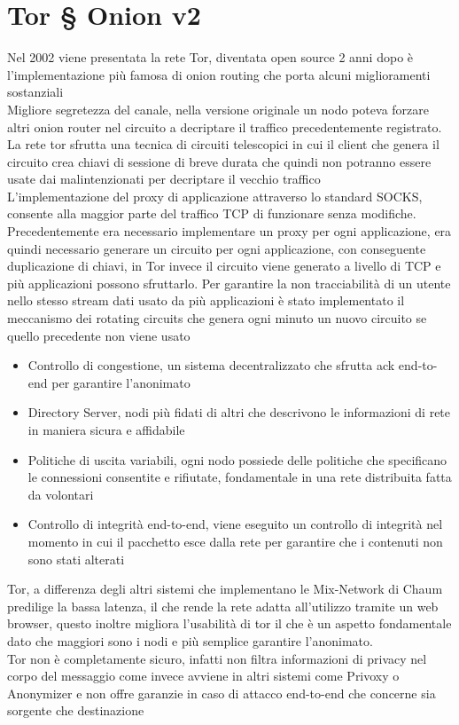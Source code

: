 \chapter{Tor § Onion v2}
\label{chap:Capitolo2}

Nel 2002 viene presentata la rete Tor, diventata open source 2 anni dopo è l'implementazione più famosa di onion routing che porta alcuni miglioramenti sostanziali \\
Migliore segretezza del canale, nella versione originale un nodo poteva forzare altri onion router nel circuito a decriptare il traffico precedentemente registrato. La rete tor sfrutta una tecnica di circuiti telescopici in cui il client che genera il circuito crea chiavi di sessione di breve durata che quindi non potranno essere usate dai malintenzionati per decriptare il vecchio traffico \\
L'implementazione del proxy di applicazione attraverso lo standard SOCKS, consente alla maggior parte del traffico TCP di funzionare senza modifiche. Precedentemente era necessario implementare un proxy per ogni applicazione, era quindi necessario generare un circuito per ogni applicazione, con conseguente duplicazione di chiavi, in Tor invece il circuito viene generato a livello di TCP e più applicazioni possono sfruttarlo. Per garantire la non tracciabilità di un utente nello stesso stream dati usato da più applicazioni è stato implementato il meccanismo dei rotating circuits che genera ogni minuto un nuovo circuito se quello precedente non viene usato
\begin{itemize}
    \item Controllo di congestione, un sistema decentralizzato che sfrutta ack end-to-end per garantire l'anonimato
    \item Directory Server, nodi più fidati di altri che descrivono le informazioni di rete in maniera sicura e affidabile
    \item Politiche di uscita variabili, ogni nodo possiede delle politiche che specificano le connessioni consentite e rifiutate, fondamentale in una rete distribuita fatta da volontari
    \item Controllo di integrità end-to-end, viene eseguito un controllo di integrità nel momento in cui il pacchetto esce dalla rete per garantire che i contenuti non sono stati alterati
\end{itemize}
Tor, a differenza degli altri sistemi che implementano le Mix-Network di Chaum predilige la bassa latenza, il che rende la rete adatta all'utilizzo tramite un web browser, questo inoltre migliora l'usabilità di tor il che è un aspetto fondamentale dato che maggiori sono i nodi e più semplice garantire l'anonimato. \\
Tor non è completamente sicuro, infatti non filtra informazioni di privacy nel corpo del messaggio come invece avviene in altri sistemi come Privoxy o Anonymizer e non offre garanzie in caso di attacco end-to-end che concerne sia sorgente che destinazione
\cite{onionv2}

